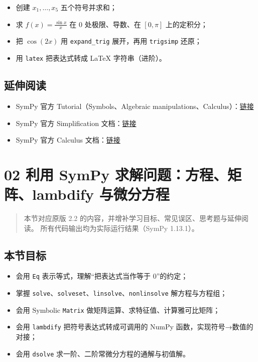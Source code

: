\begin{itemize}
\tightlist
\item
  创建 \(x_1,\dots,x_5\) 五个符号并求和；
\item
  求 \(f(x)=\frac{\sin x}{x}\) 在 0 处极限、导数、在 \([0,\pi]\)
  上的定积分；
\item
  把 \(\cos(2x)\) 用 \texttt{expand\_trig} 展开，再用 \texttt{trigsimp}
  还原；
\item
  用 \texttt{latex} 把表达式转成 LaTeX 字符串（进阶）。
\end{itemize}

\subsection{延伸阅读}\label{ux5ef6ux4f38ux9605ux8bfb-6}

\begin{itemize}
\tightlist
\item
  SymPy 官方 Tutorial（Symbols、Algebraic
  manipulations、Calculus）：\href{https://docs.sympy.org/latest/tutorial/index.html}{链接}
\item
  SymPy 官方 Simplification
  文档：\href{https://docs.sympy.org/latest/tutorial/simplification.html}{链接}
\item
  SymPy 官方 Calculus
  文档：\href{https://docs.sympy.org/latest/modules/calculus/index.html}{链接}
\end{itemize}

\section{02 利用 SymPy 求解问题：方程、矩阵、lambdify
与微分方程}\label{ux5229ux7528-sympy-ux6c42ux89e3ux95eeux9898ux65b9ux7a0bux77e9ux9635lambdify-ux4e0eux5faeux5206ux65b9ux7a0b}

\begin{quote}
本节对应原版 2.2 的内容，并增补学习目标、常见误区、思考题与延伸阅读。
所有代码输出均为实际运行结果（SymPy 1.13.1）。
\end{quote}

\subsection{本节目标}\label{ux672cux8282ux76eeux6807-12}

\begin{itemize}
\tightlist
\item
  会用 \texttt{Eq} 表示等式，理解``把表达式当作等于 0''的约定；
\item
  掌握
  \texttt{solve}、\texttt{solveset}、\texttt{linsolve}、\texttt{nonlinsolve}
  解方程与方程组；
\item
  会用 Symbolic \texttt{Matrix} 做矩阵运算、求特征值、计算雅可比矩阵；
\item
  会用 \texttt{lambdify} 把符号表达式转成可调用的 NumPy
  函数，实现符号→数值的对接；
\item
  会用 \texttt{dsolve} 求一阶、二阶常微分方程的通解与初值解。
\end{itemize}

